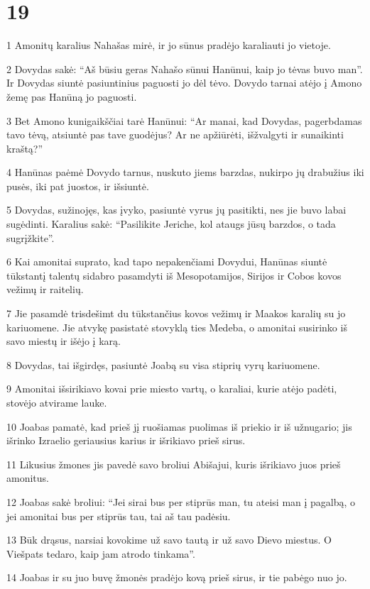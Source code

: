 \chapter{19}

\par 1 Amonitų karalius Nahašas mirė, ir jo sūnus pradėjo karaliauti jo vietoje. 
\par 2 Dovydas sakė: “Aš būsiu geras Nahašo sūnui Hanūnui, kaip jo tėvas buvo man”. Ir Dovydas siuntė pasiuntinius paguosti jo dėl tėvo. Dovydo tarnai atėjo į Amono žemę pas Hanūną jo paguosti. 
\par 3 Bet Amono kunigaikščiai tarė Hanūnui: “Ar manai, kad Dovydas, pagerbdamas tavo tėvą, atsiuntė pas tave guodėjus? Ar ne apžiūrėti, išžvalgyti ir sunaikinti kraštą?” 
\par 4 Hanūnas paėmė Dovydo tarnus, nuskuto jiems barzdas, nukirpo jų drabužius iki pusės, iki pat juostos, ir išsiuntė. 
\par 5 Dovydas, sužinojęs, kas įvyko, pasiuntė vyrus jų pasitikti, nes jie buvo labai sugėdinti. Karalius sakė: “Pasilikite Jeriche, kol ataugs jūsų barzdos, o tada sugrįžkite”. 
\par 6 Kai amonitai suprato, kad tapo nepakenčiami Dovydui, Hanūnas siuntė tūkstantį talentų sidabro pasamdyti iš Mesopotamijos, Sirijos ir Cobos kovos vežimų ir raitelių. 
\par 7 Jie pasamdė trisdešimt du tūkstančius kovos vežimų ir Maakos karalių su jo kariuomene. Jie atvykę pasistatė stovyklą ties Medeba, o amonitai susirinko iš savo miestų ir išėjo į karą. 
\par 8 Dovydas, tai išgirdęs, pasiuntė Joabą su visa stiprių vyrų kariuomene. 
\par 9 Amonitai išsirikiavo kovai prie miesto vartų, o karaliai, kurie atėjo padėti, stovėjo atvirame lauke. 
\par 10 Joabas pamatė, kad prieš jį ruošiamas puolimas iš priekio ir iš užnugario; jis išrinko Izraelio geriausius karius ir išrikiavo prieš sirus. 
\par 11 Likusius žmones jis pavedė savo broliui Abišajui, kuris išrikiavo juos prieš amonitus. 
\par 12 Joabas sakė broliui: “Jei sirai bus per stiprūs man, tu ateisi man į pagalbą, o jei amonitai bus per stiprūs tau, tai aš tau padėsiu. 
\par 13 Būk drąsus, narsiai kovokime už savo tautą ir už savo Dievo miestus. O Viešpats tedaro, kaip jam atrodo tinkama”. 
\par 14 Joabas ir su juo buvę žmonės pradėjo kovą prieš sirus, ir tie pabėgo nuo jo. 
